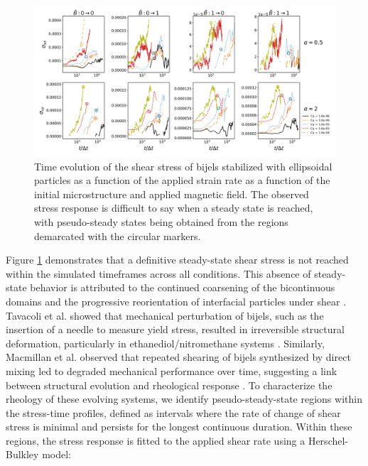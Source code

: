 \begin{figure} 
    \centering 
    \includegraphics[scale=0.3]{../figures/results/paper3/stress-time_compare.png} 
    \caption{Time evolution of the shear stress of bijels stabilized with ellipsoidal particles as a function of the applied strain rate as
             a function of the initial microstructure and applied magnetic field. The observed stress response is difficult to say when a steady
             state is reached, with pseudo-steady states being obtained from the regions demarcated with the circular markers.} 
    \label{fig:stress_time} 
\end{figure}

Figure \ref{fig:stress_time} demonstrates that a definitive steady-state shear stress is not reached within the simulated timeframes across all conditions. 
This absence of steady-state behavior is attributed to the continued coarsening of the bicontinuous domains and the progressive reorientation of interfacial 
particles under shear \cite{tavacoli_novel_2011, macmillan_rheological_2019}. Tavacoli et al. showed that mechanical perturbation of bijels, such as the 
insertion of a needle to measure yield stress, resulted in irreversible structural deformation, particularly in ethanediol/nitromethane systems 
\cite{tavacoli_novel_2011}. Similarly, Macmillan et al. observed that repeated shearing of bijels synthesized by direct mixing led to degraded mechanical 
performance over time, suggesting a link between structural evolution and rheological response \cite{macmillan_rheological_2019}. To characterize the rheology 
of these evolving systems, we identify pseudo-steady-state regions within the stress-time profiles, defined as intervals where the rate of change of shear 
stress is minimal and persists for the longest continuous duration. Within these regions, the stress response is fitted to the applied shear rate using a 
Herschel-Bulkley model:  

